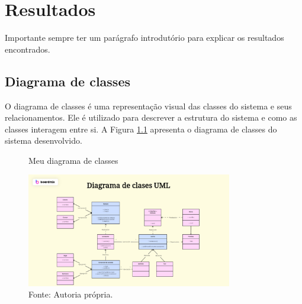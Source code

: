 \chapter{Resultados}
\label{chap:result}
Importante sempre ter um parágrafo introdutório para explicar os resultados encontrados.




\section{Diagrama de classes}
\label{sec:class}
O diagrama de classes é uma representação visual das classes do sistema e seus relacionamentos. Ele é utilizado para descrever a estrutura do sistema e como as classes interagem entre si. A Figura \ref{fig:diagrama_classes} apresenta o diagrama de classes do sistema desenvolvido.
\begin{figure} [h!]	
    \centering
    \caption{Meu diagrama de classes}
    \includegraphics[width=0.8\textwidth]{Figures/diagrama-de-clases-uml.png}
    \caption*{Fonte: Autoria própria.}
    \label{fig:diagrama_classes}
\end{figure}

